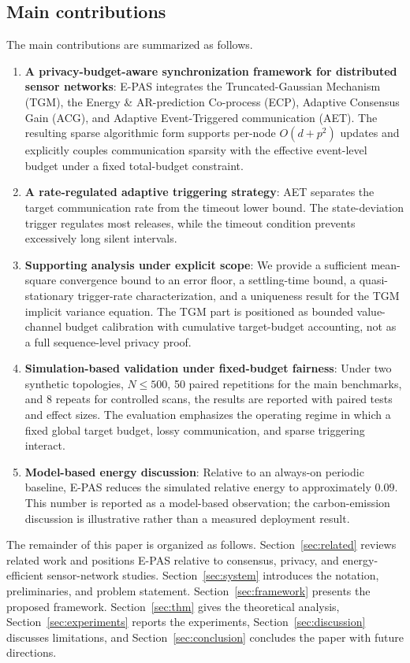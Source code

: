 \documentclass[10pt]{article}
\newcommand{\EPAS}{E-PAS}
\begin{document}
\subsection{Main contributions}

The main contributions are summarized as follows.

\begin{enumerate}
  \item \textbf{A privacy-budget-aware synchronization framework for distributed sensor networks}: \EPAS{} integrates the Truncated-Gaussian Mechanism (TGM), the Energy \& AR-prediction Co-process (ECP), Adaptive Consensus Gain (ACG), and Adaptive Event-Triggered communication (AET). The resulting sparse algorithmic form supports per-node $O(d+p^2)$ updates and explicitly couples communication sparsity with the effective event-level budget under a fixed total-budget constraint.
  \item \textbf{A rate-regulated adaptive triggering strategy}: AET separates the target communication rate from the timeout lower bound. The state-deviation trigger regulates most releases, while the timeout condition prevents excessively long silent intervals.
  \item \textbf{Supporting analysis under explicit scope}: We provide a sufficient mean-square convergence bound to an error floor, a settling-time bound, a quasi-stationary trigger-rate characterization, and a uniqueness result for the TGM implicit variance equation. The TGM part is positioned as bounded value-channel budget calibration with cumulative target-budget accounting, not as a full sequence-level privacy proof.
  \item \textbf{Simulation-based validation under fixed-budget fairness}: Under two synthetic topologies, $N\leq500$, 50 paired repetitions for the main benchmarks, and 8 repeats for controlled scans, the results are reported with paired tests and effect sizes. The evaluation emphasizes the operating regime in which a fixed global target budget, lossy communication, and sparse triggering interact.
  \item \textbf{Model-based energy discussion}: Relative to an always-on periodic baseline, \EPAS{} reduces the simulated relative energy to approximately $0.09$. This number is reported as a model-based observation; the carbon-emission discussion is illustrative rather than a measured deployment result.
\end{enumerate}

The remainder of this paper is organized as follows. Section~\ref{sec:related} reviews related work and positions \EPAS{} relative to consensus, privacy, and energy-efficient sensor-network studies. Section~\ref{sec:system} introduces the notation, preliminaries, and problem statement. Section~\ref{sec:framework} presents the proposed framework. Section~\ref{sec:thm} gives the theoretical analysis, Section~\ref{sec:experiments} reports the experiments, Section~\ref{sec:discussion} discusses limitations, and Section~\ref{sec:conclusion} concludes the paper with future directions.
\end{document}
